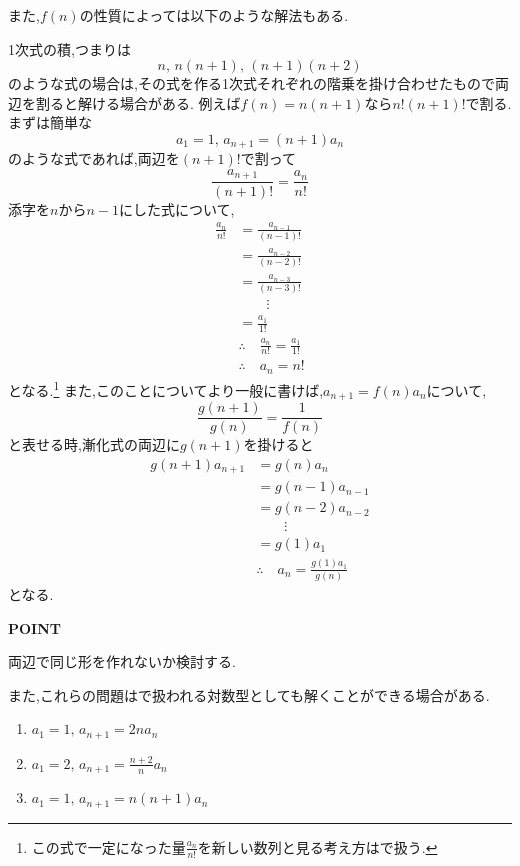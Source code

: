     また,$f(n)$の性質によっては以下のような解法もある.\\
    \label{解法：階比型：f(n)が1次式の積の場合}
    
    1次式の積,つまりは
    \[
      n,\, n(n+1), \,(n+1)(n+2)
    \]
    のような式の場合は,その式を作る1次式それぞれの階乗を掛け合わせたもので両辺を割ると解ける場合がある.
    例えば$f(n)=n(n+1)$なら$n!(n+1)!$で割る.
    まずは簡単な
    \[
      a_1=1,\,a_{n+1}=(n+1)a_n
    \]
    のような式であれば,両辺を$(n+1)!$で割って
    \[
      \frac{a_{n+1}}{(n+1)!}=\frac{a_n}{n!}
    \]
    添字を$n$から$n-1$にした式について,
    \begin{align*}
      \frac{a_{n}}{n!}&=\frac{a_{n-1}}{(n-1)!}\\
      &=\frac{a_{n-2}}{(n-2)!}\\
      &=\frac{a_{n-3}}{(n-3)!}\\
      &\qquad \vdots\\
      &=\frac{a_1}{1!}\\
      &\therefore \quad \frac{a_{n}}{n!}=\frac{a_1}{1!}\\
      &\therefore \quad a_n=n!
    \end{align*}
    となる.\footnote{この式で一定になった量$\frac{a_n}{n!}$を新しい数列と見る考え方はで扱う.}
    また,このことについてより一般に書けば,$a_{n+1}=f(n)a_n$について,
    \[
      \frac{g(n+1)}{g(n)}=\frac{1}{f(n)}
    \]
    と表せる時,漸化式の両辺に$g(n+1)$を掛けると
    \begin{align*}
      g(n+1)a_{n+1}&=g(n)a_n\\
      &=g(n-1)a_{n-1}\\
      &=g(n-2)a_{n-2}\\
      &\qquad \vdots\\
      &=g(1)a_1\\
      &\therefore \quad a_n=\frac{g(1)a_1}{g(n)}
    \end{align*}
    となる.
    
    \begin{bookpoint}
      \textbf{POINT}\par
      両辺で同じ形を作れないか検討する.
    \end{bookpoint}
  
    また,これらの問題はで扱われる対数型としても解くことができる場合がある.
  
  \noindent {}\par\nobreak
  \begin{enumerate}[label=(\arabic*),parsep=3pt,format=\bookitemlink{example-ratio-1}{problem}{hint}]
    \item $a_1=1,\, a_{n+1}=2na_n$
    \item $a_1=2,\, a_{n+1}=\frac{n+2}{n}a_n$
    \item $a_1=1,\, a_{n+1}=n(n+1)a_n$
  \end{enumerate}
  
